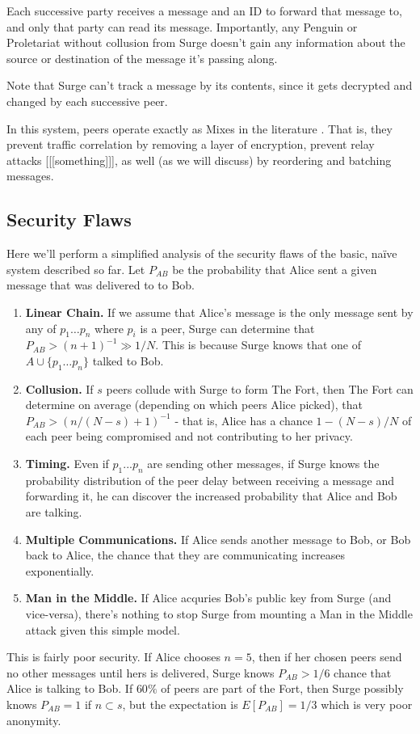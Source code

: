 \documentclass[twocolumn,11pt,english]{article}
\begin{document}
Each successive party receives a message and an ID to forward that message to, and only that party can read its message. Importantly, any Penguin or Proletariat without collusion from Surge doesn't gain any information about the source or destination of the message it's passing along. 

Note that Surge can't track a message by its contents, since it gets decrypted and changed by each successive peer. 

In this system, peers operate exactly as Mixes in the literature \cite{chaum-mix} . That is, they prevent traffic correlation by removing a layer of encryption, prevent relay attacks [[[something]]], as well (as we will discuss) by reordering and batching messages. 
\subsection{Security Flaws}
Here we'll perform a simplified analysis of the security flaws of the basic, na\"ive system described so far. 
Let $P_{AB}$ be the probability that Alice sent a given message that was delivered to to Bob. 
\begin{enumerate}
\item\textbf{Linear Chain.} If we assume that Alice's message is the only message sent by any of $p_1 \ldots p_n$ where $p_i$ is a peer, Surge can determine that $P_{AB} > (n+1)^{-1} \gg 1/N$. This is because Surge knows that one of $A \cup \{p_1 \ldots p_n\}$ talked to Bob.
\item\textbf{Collusion.} If $s$ peers collude with Surge to form The Fort, then The Fort can determine on average (depending on which peers Alice picked), that $P_{AB} > (n/(N-s)+1)^{-1}$ - that is, Alice has a chance $1 - (N-s)/N$ of each peer being compromised and not contributing to her privacy.
\item\textbf{Timing.} Even if $p_1 ... p_n$ are sending other messages, if Surge knows the probability distribution of the peer delay between receiving a message and forwarding it, he can discover the increased probability that Alice and Bob are talking. 
\item\textbf{Multiple Communications.} If Alice sends another message to Bob, or Bob back to Alice, the chance that they are communicating increases exponentially. 
\item\textbf{Man in the Middle.} If Alice acquries Bob's public key from Surge (and vice-versa), there's nothing to stop Surge from mounting a Man in the Middle attack given this simple model. 
\end{enumerate}
This is fairly poor security. If Alice chooses $n = 5$, then if her chosen peers send no other messages until hers is delivered, Surge knows $P_{AB} > 1/6$ chance that Alice is talking to Bob. If $60\%$ of peers are part of the Fort, then Surge possibly knows $P_{AB} = 1$ if $n \subset s$, but the expectation is $E[P_{AB}] = 1/3$ which is very poor anonymity.
\end{document}
